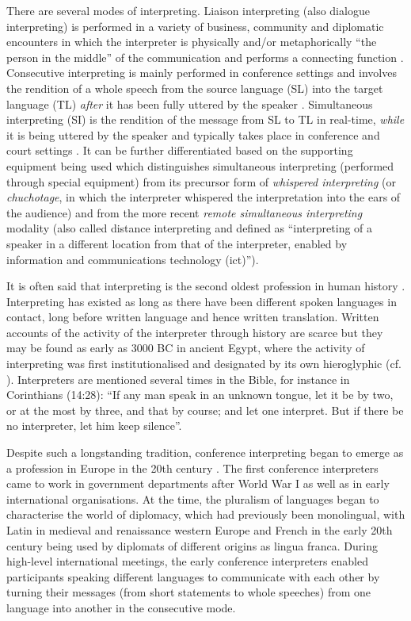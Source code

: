There are several modes of interpreting. Liaison interpreting (also dialogue interpreting) is performed in a variety of business, community and diplomatic encounters in which the interpreter is physically and/or metaphorically ``the person in the middle'' of the communication and performs a connecting function \citep{merlini2015}. Consecutive interpreting is mainly performed in conference settings and involves the rendition of a whole speech from the source language (SL) into the target language (TL) \textit{after} it has been fully uttered by the speaker \citep{andres2015consecutive}. Simultaneous interpreting (SI) is the rendition of the message from SL to TL in real-time, \textit{while} it is being uttered by the speaker and typically takes place in conference and court settings \citep{pochhacker2015b}.  It can be further differentiated based on the supporting equipment being used \citep{pochhacker2015b} which distinguishes simultaneous interpreting (performed through special equipment) from its precursor form of \textit{whispered interpreting} (or \textit{chuchotage}, in which the interpreter whispered the interpretation into the ears of the audience) and from the more recent \textit{remote simultaneous interpreting} modality (also called distance interpreting and defined as ``interpreting of a speaker in a different location from that of the interpreter, enabled by information and communications technology (ict)'').

It is often said that interpreting is the second oldest profession in human history \citep[10]{baigorri2014paris}. Interpreting has existed as long as there have been different spoken languages in contact, long before written language and hence written translation. Written accounts of the activity of the interpreter through history are scarce but they may be found as early as 3000 BC in ancient Egypt, where the activity of interpreting was first institutionalised and designated by its own hieroglyphic (cf. \cite{falbo2016going,kurz1985rock}). Interpreters are mentioned several times in the Bible, for instance in Corinthians (14:28): ``If any man speak in an unknown tongue, let it be by two, or at the most by three, and that by course; and let one interpret. But if there be no interpreter, let him keep silence''.

\begin{sloppypar}
Despite such a longstanding tradition, conference interpreting began to emerge as a profession in Europe in the 20th century \citep{baigorri2014paris}. The first conference interpreters came to work in government departments after World War I as well as in early international organisations. At the time, the pluralism of languages began to characterise the world of diplomacy, which had previously been monolingual, with Latin in medieval and renaissance western Europe and French in the early 20th century being used by diplomats of different origins as lingua franca. During high-level international meetings, the early conference interpreters enabled participants speaking different languages to communicate with each other by turning their messages (from short statements to whole speeches) from one language into another in the consecutive mode.
\end{sloppypar}

